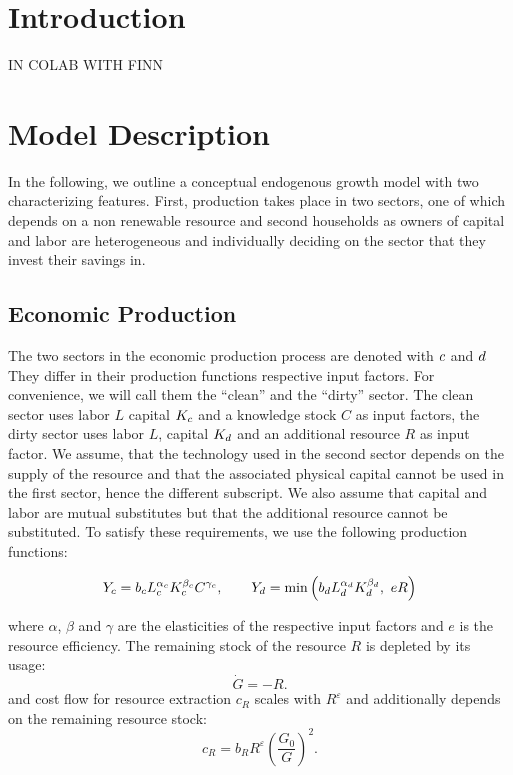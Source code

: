 \section{Introduction}

IN COLAB WITH FINN

\section{Model Description}
In the following, we outline a conceptual endogenous growth model with two characterizing features. First, production takes place in two sectors, one of which depends on a non renewable resource and second households as owners of capital and labor are heterogeneous and individually deciding on the sector that they invest their savings in.

\subsection{Economic Production}
The two sectors in the economic production process are denoted with $c$ and $d$ They differ in their production functions respective input factors. For convenience, we will call them the ``clean'' and the ``dirty'' sector. The clean sector uses labor $L$ capital $K_c$ and a knowledge stock $C$ as input factors, the dirty sector uses labor $L$, capital $K_d$ and an additional resource $R$ as input factor. We assume, that the technology used in the second sector depends on the supply of the resource and that the associated physical capital cannot be used in the first sector, hence the different subscript. We also assume that capital and labor are mutual substitutes but that the additional resource cannot be substituted. To satisfy these requirements, we use the following production functions: 

\begin{equation}
	Y_c = b_c L_c^{\alpha_c} K_c^{\beta_c} C^{\gamma_c},\qquad Y_d = \min\left(b_d L_d^{\alpha_d} K_d^{\beta_d}, \ e R \right)
\end{equation}

where $\alpha$, $\beta$ and $\gamma$ are the elasticities of the respective input factors and $e$ is the resource efficiency.
The remaining stock of the resource $R$ is depleted by its usage:
\begin{equation}
	\dot{G} = -R.
	\label{resource_extraction}
\end{equation}
and cost flow for resource extraction $c_R$ scales with $R^{\varepsilon}$ and additionally depends on the remaining resource stock:
\begin{equation}
	c_R = b_R R^{\varepsilon} \left( \frac{G_0}{G} \right)^{2}.
	\label{resource_extraction_cost}
\end{equation}

